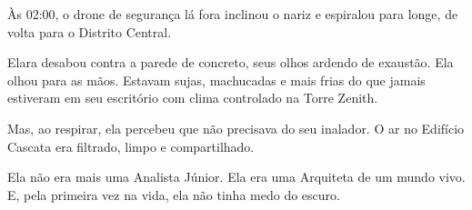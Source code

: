 Às 02:00, o drone de segurança lá fora inclinou o nariz e espiralou para longe, de volta para o Distrito Central.


Elara desabou contra a parede de concreto, seus olhos ardendo de exaustão. Ela olhou para as mãos. Estavam sujas, machucadas e mais frias do que jamais estiveram em seu escritório com clima controlado na Torre Zenith.

Mas, ao respirar, ela percebeu que não precisava do seu inalador. O ar no Edifício Cascata era filtrado, limpo e compartilhado.

Ela não era mais uma Analista Júnior. Ela era uma Arquiteta de um mundo vivo. E, pela primeira vez na vida, ela não tinha medo do escuro.
